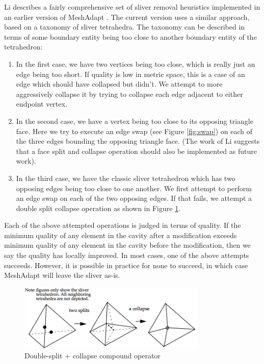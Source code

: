 Li describes a fairly comprehensive set of sliver removal
heuristics implemented in an earlier version of MeshAdapt
\cite{li2003mesh}.
The current version uses a similar approach, based on a
taxonomy of sliver tetrahedra.
The taxonomy can be described in terms of some boundary
entity being too close to another boundary entity
of the tetrahedron:
\begin{enumerate}
\item In the first case, we have two vertices being too
close, which is really just an edge being too short.
If quality is low in metric space, this is a case
of an edge which should have collapsed but didn't.
We attempt to more aggressively collapse it by trying
to collapse each edge adjacent to either endpoint vertex.
\item In the second case, we have a vertex being too close
to its opposing triangle face.
Here we try to execute an edge swap (see Figure \ref{fig:swap})
on each of the three edges bounding the opposing triangle face.
(The work of Li suggests that a face split and collapse operation
should also be implemented as future work).
\item In the third case, we have the classic sliver tetrahedron
which has two opposing edges being too close to one another.
We first attempt to perform an edge swap on each of the two
opposing edges.
If that fails, we attempt a double split collapse operation
as shown in Figure \ref{fig:compound}.
\end{enumerate}
Each of the above attempted operations is judged in terms of quality.
If the minimum quality of any element in the cavity after a modification
exceeds minimum quality of any element in the cavity before the
modification, then we say the quality has locally improved.
In most cases, one of the above attempts succeeds.
However, it is possible in practice for none to succeed, in which
case MeshAdapt will leave the sliver as-is.

\begin{figure}
\begin{center}
\includegraphics[width=0.8\textwidth]{split_collapse.png}
\caption{Double-split + collapse compound operator
\cite{li2003mesh}}
\label{fig:compound}
\end{center}
\end{figure}

